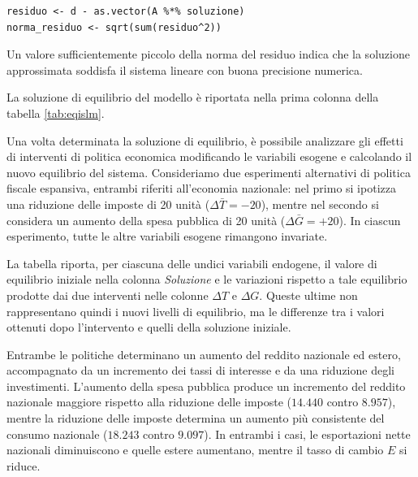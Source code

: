 \begin{verbatim}
residuo <- d - as.vector(A %*% soluzione)
norma_residuo <- sqrt(sum(residuo^2))
\end{verbatim}

Un valore sufficientemente piccolo della norma
del residuo indica che la soluzione approssimata
soddisfa il sistema lineare con buona precisione
numerica.

La soluzione di equilibrio del modello è riportata nella prima colonna della tabella \ref{tab:eqislm}.

Una volta determinata la soluzione di equilibrio,
è possibile analizzare gli effetti di interventi di politica
economica modificando le variabili esogene e calcolando il
nuovo equilibrio del sistema. Consideriamo due esperimenti
alternativi di politica fiscale espansiva, entrambi riferiti
all'economia nazionale: nel primo si ipotizza una riduzione
delle imposte di 20 unità ($\Delta \bar{T}=-20$), mentre
nel secondo si considera un aumento della spesa pubblica
di 20 unità ($\Delta \bar{G}=+20$).
In ciascun esperimento, tutte le altre variabili esogene
rimangono invariate.

La tabella riporta, per ciascuna delle undici variabili
endogene, il valore di equilibrio iniziale nella colonna
\emph{Soluzione} e le variazioni rispetto a tale equilibrio
prodotte dai due interventi nelle colonne $\Delta T$ e
$\Delta G$. Queste ultime non rappresentano quindi i nuovi
livelli di equilibrio, ma le differenze tra i valori
ottenuti dopo l'intervento e quelli della soluzione iniziale.

Entrambe le politiche determinano un aumento del reddito
nazionale ed estero, accompagnato da un incremento dei
tassi di interesse e da una riduzione degli investimenti.
L'aumento della spesa pubblica produce un incremento del
reddito nazionale maggiore rispetto alla riduzione delle
imposte ($14.440$ contro $8.957$), mentre la riduzione
delle imposte determina un aumento più consistente del
consumo nazionale ($18.243$ contro $9.097$).
In entrambi i casi, le esportazioni nette nazionali
diminuiscono e quelle estere aumentano, mentre il tasso
di cambio $E$ si riduce.

